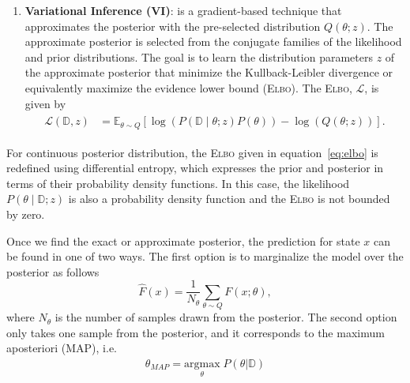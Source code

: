 \begin{enumerate}
\item \textbf{Variational Inference (VI)}: is a gradient-based technique that approximates the posterior with the pre-selected
distribution $Q(\theta;z)$.
%
The approximate posterior is selected from the conjugate families of the likelihood and
prior distributions. The goal is to learn the distribution parameters $z$ of the approximate posterior that
minimize the Kullback-Leibler divergence or equivalently maximize the evidence
lower bound (\textsc{Elbo}). The \textsc{Elbo}, $\mathcal{L}$, is given
by~\cite{cohen2016bayesian}
\begin{align}
  \begin{split}
  \mathcal{L}(\mathbb{D},z) &= \mathbb{E}_{\theta \sim Q} \left[\log(P(\mathbb{D} \mid \theta;z)P(\theta)) - \log(Q(\theta;z)) \right].
  \end{split}
  \label{eq:elbo}
\end{align}
\end{enumerate}

\begin{rem}
  For continuous posterior distribution, the \textsc{Elbo} given in
  equation~\eqref{eq:elbo} is redefined using differential entropy, which
  expresses the prior and posterior in terms of their probability density
  functions. In this case, the likelihood $P(\theta \mid \mathbb{D};z)$ is also
  a probability density function and the \textsc{Elbo} is not bounded by zero.
\end{rem}


Once we find the exact or approximate posterior, the prediction for state $x$
can be found in one of two ways. The first option is to marginalize the model
over the posterior as follows~\cite{jospin2020hands}
\begin{equation}
  \hat{F}(x) = \frac{1}{N_{\theta}} \sum_{\theta \sim Q} F(x; \theta),
  \label{eqn:marginalization}
\end{equation} 
where $N_{\theta}$ is the number of samples drawn from the posterior. 
%
%
%
The second option only takes one sample from the posterior, and it corresponds
to the maximum aposteriori (MAP), i.e. 
\begin{align} 
  \theta_{MAP}=\underset{\theta}{\textrm{argmax}}\; P(\theta | \mathbb{D})
\end{align}

